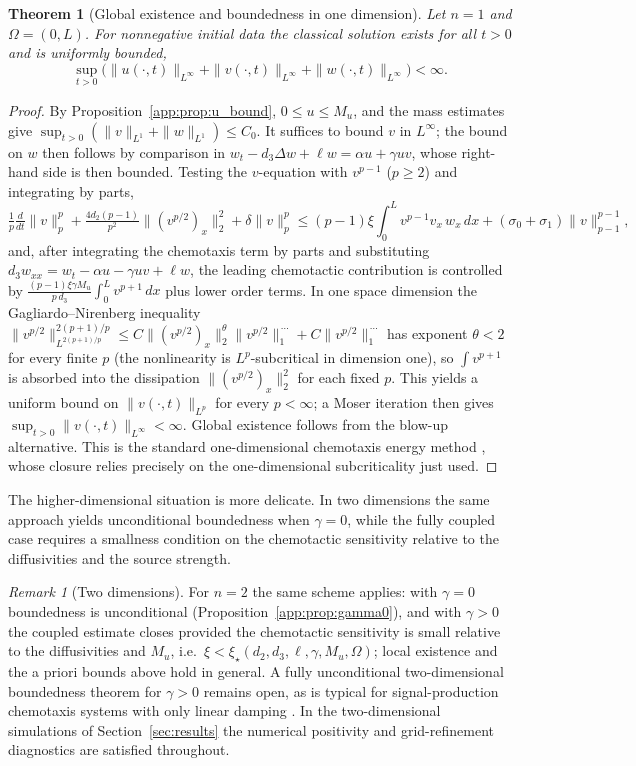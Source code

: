 \documentclass[]{interact}
\theoremstyle{plain}%
\newtheorem{theorem}{Theorem}[section]
\theoremstyle{definition}
\theoremstyle{remark}
\newtheorem{remark}{Remark}
\newcommand{\Om}{\Omega}
\begin{document}
\begin{theorem}[Global existence and boundedness in one dimension]
\label{app:thm:1d}
Let $n=1$ and $\Om=(0,L)$. For nonnegative initial data the classical solution
exists for all $t>0$ and is uniformly bounded,
\[
\sup_{t>0}\big(\|u(\cdot,t)\|_{L^\infty}+\|v(\cdot,t)\|_{L^\infty}
+\|w(\cdot,t)\|_{L^\infty}\big)<\infty .
\]
\end{theorem}

\begin{proof}
By Proposition~\ref{app:prop:u_bound}, $0\le u\le M_u$, and the mass estimates
give $\sup_{t>0}(\|v\|_{L^1}+\|w\|_{L^1})\le C_0$. It suffices to bound $v$ in
$L^\infty$; the bound on $w$ then follows by comparison in
$w_t-d_3\Delta w+\ell w=\alpha u+\gamma uv$, whose right-hand side is then
bounded. Testing the $v$-equation with $v^{p-1}$ ($p\ge2$) and integrating by
parts,
\[
\tfrac1p\tfrac{d}{dt}\|v\|_p^p+\tfrac{4d_2(p-1)}{p^2}\big\|(v^{p/2})_x\big\|_2^2
+\delta\|v\|_p^p
\le (p-1)\xi\!\int_0^L\! v^{p-1}v_x\,w_x\,dx+(\sigma_0+\sigma_1)\|v\|_{p-1}^{p-1},
\]
and, after integrating the chemotaxis term by parts and substituting
$d_3w_{xx}=w_t-\alpha u-\gamma uv+\ell w$, the leading chemotactic contribution is
controlled by $\tfrac{(p-1)\xi\gamma M_u}{p\,d_3}\int_0^L v^{p+1}\,dx$ plus lower
order terms. In one space dimension the Gagliardo--Nirenberg inequality
$\|v^{p/2}\|_{L^{2(p+1)/p}}^{2(p+1)/p}\le
C\big\|(v^{p/2})_x\big\|_2^{\theta}\|v^{p/2}\|_1^{\,\cdots}+C\|v^{p/2}\|_1^{\,\cdots}$
has exponent $\theta<2$ for every finite $p$ (the nonlinearity is
$L^p$-subcritical in dimension one), so $\int v^{p+1}$ is absorbed into the
dissipation $\big\|(v^{p/2})_x\big\|_2^2$ for each fixed $p$. This yields a
uniform bound on $\|v(\cdot,t)\|_{L^p}$ for every $p<\infty$; a Moser iteration
then gives $\sup_{t>0}\|v(\cdot,t)\|_{L^\infty}<\infty$. Global existence follows
from the blow-up alternative. This is the
standard one-dimensional chemotaxis energy method \cite{hillen2009user}, whose
closure relies precisely on the one-dimensional subcriticality just used.
\end{proof}

The higher-dimensional situation is more delicate. In two dimensions the same
approach yields unconditional boundedness when $\gamma=0$, while the fully
coupled case requires a smallness condition on the chemotactic sensitivity
relative to the diffusivities and the source strength.

\begin{remark}[Two dimensions]
\label{app:rmk:2d}
For $n=2$ the same scheme applies: with $\gamma=0$ boundedness is unconditional
(Proposition~\ref{app:prop:gamma0}), and with $\gamma>0$ the coupled estimate
closes provided the chemotactic sensitivity is small relative to the
diffusivities and $M_u$, i.e.\ $\xi<\xi_\star(d_2,d_3,\ell,\gamma,M_u,\Om)$;
local existence and the a priori bounds above hold in general. A fully
unconditional two-dimensional boundedness theorem for $\gamma>0$ remains open,
as is typical for signal-production chemotaxis systems with only linear damping
\cite{hillen2009user}. In the two-dimensional simulations of
Section~\ref{sec:results} the numerical positivity and grid-refinement
diagnostics are satisfied throughout.
\end{remark}
\end{document}
